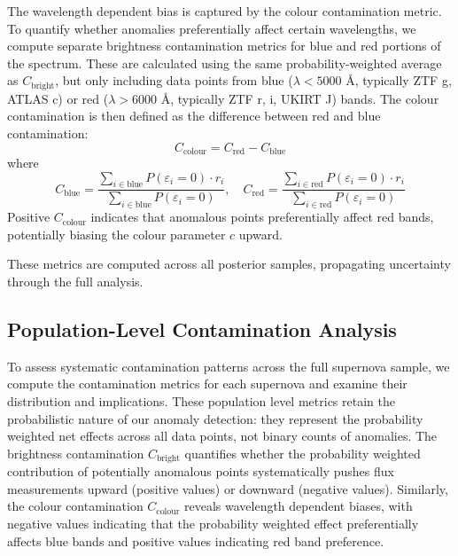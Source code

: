 The wavelength dependent bias is captured by the colour contamination metric. To quantify whether anomalies preferentially affect certain wavelengths, we compute separate brightness contamination metrics for blue and red portions of the spectrum. These are calculated using the same probability-weighted average as $C_{\mathrm{bright}}$, but only including data points from blue ($\lambda < 5000$ Å, typically ZTF g, ATLAS c) or red ($\lambda > 6000$ Å, typically ZTF r, i, UKIRT J) bands. The colour contamination is then defined as the difference between red and blue contamination:
\begin{equation}
    C_{\mathrm{colour}} = C_{\mathrm{red}} - C_{\mathrm{blue}}
\end{equation}
where
\begin{equation}
    C_{\mathrm{blue}} = \frac{\sum_{i \in \text{blue}} P(\varepsilon_i = 0) \cdot r_i}{\sum_{i \in \text{blue}} P(\varepsilon_i = 0)}, \quad C_{\mathrm{red}} = \frac{\sum_{i \in \text{red}} P(\varepsilon_i = 0) \cdot r_i}{\sum_{i \in \text{red}} P(\varepsilon_i = 0)}
\end{equation}
Positive $C_{\mathrm{colour}}$ indicates that anomalous points preferentially affect red bands, potentially biasing the colour parameter $c$ upward.

These metrics are computed across all posterior samples, propagating uncertainty through the full analysis.

\subsection{Population-Level Contamination Analysis}
\label{subsec:population_contamination}

To assess systematic contamination patterns across the full supernova sample, we compute the contamination metrics for each supernova and examine their distribution and implications. These population level metrics retain the probabilistic nature of our anomaly detection: they represent the probability weighted net effects across all data points, not binary counts of anomalies. The brightness contamination $C_{\mathrm{bright}}$ quantifies whether the probability weighted contribution of potentially anomalous points systematically pushes flux measurements upward (positive values) or downward (negative values). Similarly, the colour contamination $C_{\mathrm{colour}}$ reveals wavelength dependent biases, with negative values indicating that the probability weighted effect preferentially affects blue bands and positive values indicating red band preference.

